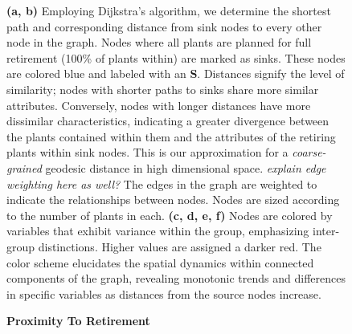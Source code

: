 \begin{figure}[H]
    \caption{\textbf{Proximity To Retirement}}
    \medskip
    \footnotesize
    \textbf{(a, b)} Employing Dijkstra's algorithm, we determine the shortest path and corresponding distance from sink nodes to every other node in the graph. Nodes where all plants are planned for full retirement (100\% of plants within) are marked as sinks. These nodes are colored blue and labeled with an \textbf{S}. Distances signify the level of similarity; nodes with shorter paths to sinks share more similar attributes. Conversely, nodes with longer distances have more dissimilar characteristics, indicating a greater divergence between the plants contained within them and the attributes of the retiring plants within sink nodes.  This is our approximation for a \textit{coarse-grained} geodesic distance in high dimensional space. \textit{explain edge weighting here as well?}
    The edges in the graph are weighted to indicate the relationships between nodes. Nodes are sized according to the number of plants in each. 
    \textbf{(c, d, e, f)} Nodes are colored by variables that exhibit variance within the group, emphasizing inter-group distinctions. Higher values are assigned a darker red. The color scheme elucidates the spatial dynamics within connected components of the graph, revealing monotonic trends and differences in specific variables as distances from the source nodes increase.
    \label{fig:shortest-path-graphs}
\end{figure}




